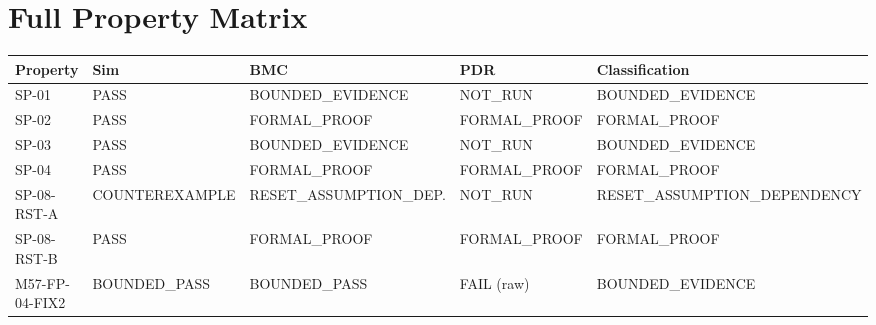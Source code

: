\section{Full Property Matrix}
\label{app:full-matrix}

\footnotesize
\begin{tabular}{@{}lllll@{}}
\toprule
Property & Sim & BMC & PDR & Classification \\
\midrule
SP-01 & PASS & BOUNDED\_EVIDENCE & NOT\_RUN & BOUNDED\_EVIDENCE \\
SP-02 & PASS & FORMAL\_PROOF & FORMAL\_PROOF & FORMAL\_PROOF \\
SP-03 & PASS & BOUNDED\_EVIDENCE & NOT\_RUN & BOUNDED\_EVIDENCE \\
SP-04 & PASS & FORMAL\_PROOF & FORMAL\_PROOF & FORMAL\_PROOF \\
SP-08-RST-A & COUNTEREXAMPLE & RESET\_ASSUMPTION\_DEP. & NOT\_RUN & RESET\_ASSUMPTION\_DEPENDENCY \\
SP-08-RST-B & PASS & FORMAL\_PROOF & FORMAL\_PROOF & FORMAL\_PROOF \\
M57-FP-04-FIX2 & BOUNDED\_PASS & BOUNDED\_PASS & FAIL (raw) & BOUNDED\_EVIDENCE \\
\bottomrule
\end{tabular}

